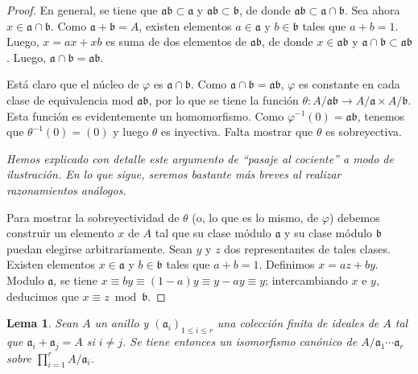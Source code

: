 \documentclass[10pt,oneside,bibtotoc,smallheadings,leqno,a5paper,DIV=12]{scrbook}
\newcommand{\idl}[1]{\mathfrak{#1}}
\newcommand{\QED}{}%
\renewcommand{\to}[1][]{\xrightarrow{#1}}
\numberwithin{equation}{section}
\newenvironment{comm}%
	{\begin{trivlist}\item\small\itshape}
	{\end{trivlist}}
\theoremstyle{defi}
\theoremstyle{enonce}
\newtheorem{lemma}{Lema}
\theoremstyle{rem}
\numberwithin{theorem}{section}
\numberwithin{proposition}{section}
\numberwithin{definition}{section}
\numberwithin{lemma}{section}
\numberwithin{corollary}{section}
\numberwithin{example}{section}
\numberwithin{footnote}{section}%
\begin{document}
\begin{proof}
En general, se tiene que $\idl{a}\idl{b}\subset\idl{a}$ y $\idl{a}\idl{b}\subset\idl{b}$, de
donde $\idl{a}\idl{b}\subset\idl{a}\cap\idl{b}$. Sea ahora $x\in\idl{a}\cap\idl{b}$.
Como $\idl{a}+\idl{b}=A$, existen elementos $a\in\idl{a}$ y $b\in\idl{b}$ tales
que $a+b=1$. Luego, $x = ax+xb$ es suma de dos elementos de $\idl{a}\idl{b}$, de donde
$x\in\idl{a}\idl{b}$ y $\idl{a}\cap\idl{b}\subset\idl{a}\idl{b}$. Luego,
$\idl{a}\cap\idl{b} = \idl{a}\idl{b}$.

Est\'a claro que el n\'ucleo de $\varphi$ es $\idl{a}\cap\idl{b}$. Como $\idl{a}\cap\idl{b}
=\idl{a}\idl{b}$, $\varphi$ es constante en cada clase de equivalencia mod $\idl{a}\idl{b}$,
por lo que se tiene la funci\'on $\theta : A/\idl{a}\idl{b}\to A/\idl{a}\times A/\idl{b}$.
Esta funci\'on es evidentemente un homomorfismo. Como $\varphi^{-1}(0) = \idl{a}\idl{b}$,
tenemos que $\theta^{-1}(0) = (0)$ y luego $\theta$ es inyectiva. Falta mostrar que $\theta$
es sobreyectiva.

\begin{comm}
Hemos explicado con detalle este argumento de ``pasaje al cociente'' a modo de ilustraci\'on.
En lo que sigue, seremos bastante m\'as breves al realizar razonamientos an\'alogos.
\end{comm}

Para mostrar la sobreyectividad de $\theta$ (o, lo que es lo mismo, de $\varphi$) debemos construir
un elemento $x$ de $A$ tal que su clase m\'odulo $\idl{a}$ y su clase m\'odulo $\idl{b}$ puedan
elegirse arbitrariamente. Sean $y$ y $z$ dos representantes de tales clases. Existen elementos
$x\in\idl{a}$ y $b\in\idl{b}$ tales que $a+b=1$. Definimos $x = az+by$. Modulo $\idl{a}$,
se tiene $x\equiv by\equiv (1-a)y\equiv y-ay\equiv y$; intercambiando $x$ e $y$, deducimos
que $x\equiv z\bmod\idl{b}$. \QED
\end{proof}

\begin{lemma}\label{lem1.3.2}
Sean $A$ un anillo y $(\idl{a}_{i})_{1\leq i\leq r}$ una colecci\'on finita de ideales de $A$
tal que $\idl{a}_{i}+\idl{a}_{j} = A$ si $i\neq j$. Se tiene entonces un isomorfismo can\'onico
de $A/\idl{a}_{1}\cdots\idl{a}_{r}$ sobre $\prod_{i=1}^{r}A/\idl{a}_{i}$.
\end{lemma}
\end{document}
